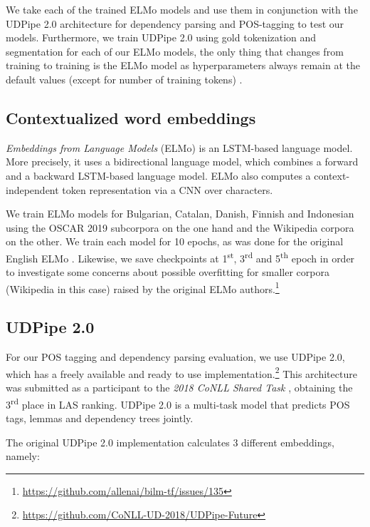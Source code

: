 We take each of the trained ELMo models and use them in conjunction with the UDPipe 2.0 \citep{straka-2018-udpipe,straka-strakova-2019-evaluating} architecture for dependency parsing and POS-tagging to test our models. Furthermore, we train UDPipe 2.0 using gold tokenization and segmentation for each of our ELMo models, the only thing that changes from training to training is the ELMo model as hyperparameters always remain at the default values (except for number of training tokens) \citep{peters-etal-2018-deep}.

\subsection{Contextualized word embeddings}

\emph{Embeddings from Language Models} (ELMo) \citep{peters-etal-2018-deep} is an LSTM-based language model. More precisely, it uses a bidirectional language model, which combines a forward and a backward LSTM-based language model. ELMo also computes a context-independent token representation via a CNN over characters.

We train ELMo models for Bulgarian, Catalan, Danish, Finnish and Indonesian using the OSCAR 2019 subcorpora on the one hand and the Wikipedia corpora on the other. We train each model for 10 epochs, as was done for the original English ELMo \citep{peters-etal-2018-deep}. Likewise, we save checkpoints at 1\textsuperscript{st}, 3\textsuperscript{rd} and 5\textsuperscript{th} epoch in order to investigate some concerns about possible overfitting for smaller corpora (Wikipedia in this case) raised by the original ELMo authors.\footnote{\url{https://github.com/allenai/bilm-tf/issues/135}}

\subsection{UDPipe 2.0} \label{udpipe-future}

For our POS tagging and dependency parsing evaluation, we use UDPipe 2.0, which has a freely available and ready to use implementation.\footnote{\url{https://github.com/CoNLL-UD-2018/UDPipe-Future}} This architecture was submitted as a participant to the \emph{2018 CoNLL Shared Task} \citep{zeman-etal-2018-conll}, obtaining the 3\textsuperscript{rd} place in LAS ranking. UDPipe 2.0 is a multi-task model that predicts POS tags, lemmas and dependency trees jointly.

The original UDPipe 2.0 implementation calculates 3 different embeddings, namely:

